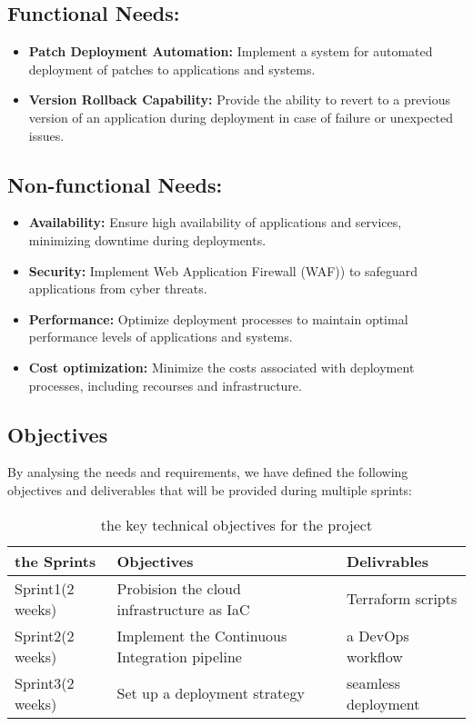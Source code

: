 \subsection{Functional Needs:}
\begin{itemize}
    \item \textbf{Patch Deployment Automation:} Implement a system for automated deployment of patches to applications and systems.
    \item \textbf{Version Rollback Capability:} Provide the ability to revert to a previous version of an application during deployment in case of failure or unexpected issues.
\end{itemize}
\subsection{Non-functional Needs:}
\noindent
\begin{itemize}
    \item \textbf{Availability:} Ensure high availability of applications and services, minimizing downtime during deployments.
    \item \textbf{Security:} Implement Web Application Firewall (WAF)) to safeguard applications from cyber threats.
    \item \textbf{Performance:} Optimize deployment processes to maintain optimal performance levels of applications and systems.
    \item \textbf{Cost optimization:} Minimize the costs associated with deployment processes, including recourses and infrastructure.
\end{itemize}

\subsection{Objectives}
By analysing the needs and requirements, we have defined the following objectives and deliverables that will be provided during multiple sprints:
\begin{longtable}[c]{
    |p{}
    |p{}|
    p{}|
    }
    \caption{the key technical objectives for the project}
    \label{tab:objectivesTable}                      \\
    \hline

    the Sprints
     & Objectives
     & Delivrables                                   \\
    \hline

    Sprint1(2 weeks)
     & Probision the cloud infrastructure as IaC
     & Terraform scripts                             \\
    \hline

    Sprint2(2 weeks)
     & Implement the Continuous Integration pipeline
     & a DevOps workflow                             \\
    \hline

    Sprint3(2 weeks)
     & Set up a deployment strategy
     & seamless deployment                           \\
    \hline
\end{longtable}

